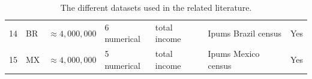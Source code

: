 \begin{landscape}
\begin{table}
\begin{tabular}{rllllll}
      14     & BR              & $\approx 4,000,000$     & 6 numerical    & total income          & Ipums Brazil census           & Yes             \\
      15     & MX              & $\approx 4,000,000$        & 5 numerical   & total income          & Ipums Mexico census        & Yes             \\
      \bottomrule
    \end{tabular}
    \caption{The different datasets used in the related literature.}
    \label{tab:datasets}
  \end{table}
\end{landscape}

